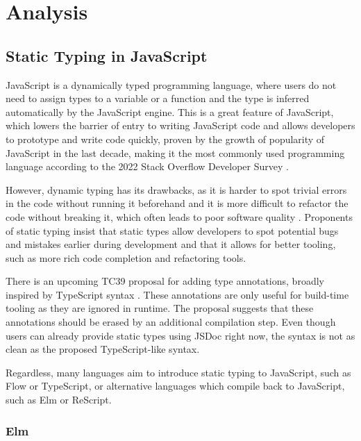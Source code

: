 \chapter{Analysis}

\section{Static Typing in JavaScript}

JavaScript is a dynamically typed programming language, where users do not need to assign types to a variable or a function and the type is inferred automatically by the JavaScript engine. This is a great feature of JavaScript, which lowers the barrier of entry to writing JavaScript code and allows developers to prototype and write code quickly, proven by the growth of popularity of JavaScript in the last decade, making it the most commonly used programming language according to the 2022 Stack Overflow Developer Survey \cite{StackOverflowDeveloper}.

However, dynamic typing has its drawbacks, as it is harder to spot trivial errors in the code without running it beforehand and it is more difficult to refactor the code without breaking it, which often leads to poor software quality \cite{fardJSNOSEDetectingJavaScript2013a}. Proponents of static typing insist that static types allow developers to spot potential bugs and mistakes earlier during development and that it allows for better tooling, such as more rich code completion and refactoring tools.

There is an upcoming TC39 proposal for adding type annotations, broadly inspired by TypeScript syntax \cite{ECMAScriptProposalType2023}. These annotations are only useful for build-time tooling as they are ignored in runtime. The proposal suggests that these annotations should be erased by an additional compilation step. Even though users can already provide static types using JSDoc right now, the syntax is not as clean as the proposed TypeScript-like syntax.

Regardless, many languages aim to introduce static typing to JavaScript, such as Flow or TypeScript, or alternative languages which compile back to JavaScript, such as Elm or ReScript.

\subsection{Elm}

